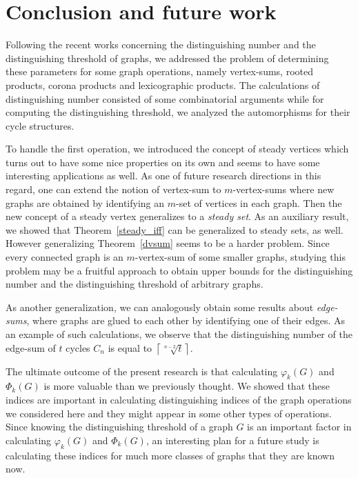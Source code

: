 \documentclass[12pt,a4paper, longbibliography]{article}
\theoremstyle{definition}
\numberwithin{equation}{section}
\begin{document}
	
	

	
	\section{Conclusion and future work}\label{conclusion}
	
	Following the recent works concerning  the distinguishing number and the distinguishing  threshold of graphs,   we addressed the problem of determining these parameters for some graph operations, namely vertex-sums, rooted products, corona products and lexicographic products. 
	The calculations of distinguishing number   consisted of some combinatorial arguments  while for computing the distinguishing threshold, we analyzed the automorphisms for their cycle structures.
	
	To handle the first operation, we introduced the concept of steady vertices which turns out to have some nice properties on its own and seems to have some interesting applications as well. As one of future research directions in this regard, one can extend the notion of vertex-sum to $m$-vertex-sums where new graphs are obtained by identifying an $m$-set of vertices in each graph. Then the new concept  of a steady vertex generalizes to  a  \emph{steady set}. As an auxiliary result, we showed that Theorem~\ref{steady_iff} can be generalized to steady sets, as well. However 
   generalizing Theorem~\ref{dvsum} seems to be a harder problem.  Since every connected graph is an $m$-vertex-sum of some smaller graphs, studying  this problem may be a fruitful approach  to obtain upper bounds for the distinguishing number and the  distinguishing threshold of arbitrary graphs.
	
	
	As another generalization, we can analogously obtain some results about \emph{edge-sums}, where graphs are glued to each other by identifying one of their edges. As an example of such calculations, we observe that    the distinguishing number of the edge-sum of $t$ cycles  $C_n$ is equal to $ \left\lceil{\sqrt[n-2]{t}}\right\rceil$. 
	
	The ultimate outcome of the present research is that calculating $\varphi_k (G)$ and $\Phi_k (G)$ is more valuable than we previously thought. We showed that these indices are important in calculating distinguishing indices of the graph operations we considered here and they might appear in some other types of operations. Since knowing the distinguishing threshold of a graph $G$ is an important factor in calculating $\varphi_k (G)$ and $\Phi_k (G)$, an interesting plan for a future study is calculating these indices for much more classes of graphs that they are known now. 
	
	
	
	
	
	
	
	
	
	
\end{document}
